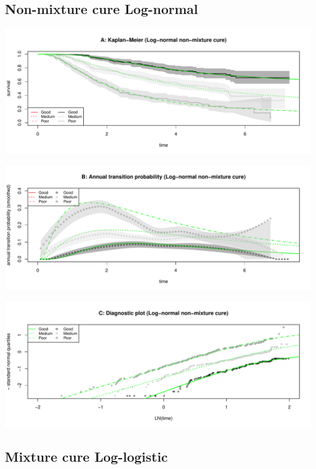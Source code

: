 \documentclass[]{article}
\begin{document}
\subsection{Non-mixture cure
Log-normal}\label{non-mixture-cure-log-normal}

\begin{flushleft}\includegraphics[height=0.25\textheight]{Images/cure_lnorm_nmix-1} \end{flushleft}

\begin{flushleft}\includegraphics[height=0.25\textheight]{Images/cure_lnorm_nmix-2} \end{flushleft}

\begin{flushleft}\includegraphics[height=0.25\textheight]{Images/cure_lnorm_nmix-3} \end{flushleft}

\subsection{Mixture cure Log-logistic}\label{mixture-cure-log-logistic}
\end{document}
